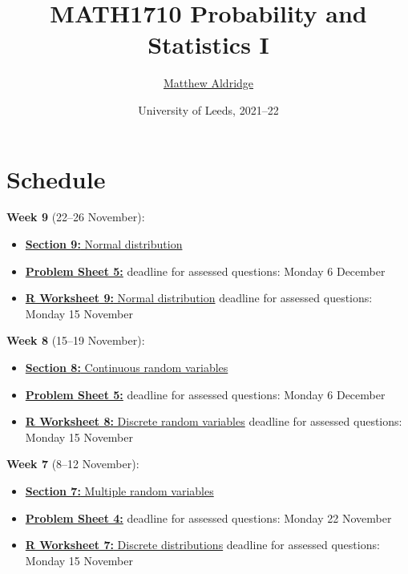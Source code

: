 \documentclass[
  a4paper,
]{book}
\title{MATH1710 Probability and Statistics I}
\author{\href{mailto:math1710@leeds.ac.uk}{Matthew Aldridge}}
\date{University of Leeds, 2021--22}
\providecommand{\tightlist}{%
  \setlength{\itemsep}{0pt}\setlength{\parskip}{0pt}}
\theoremstyle{definition}
\theoremstyle{definition}
\theoremstyle{definition}
\theoremstyle{definition}
\theoremstyle{remark}
\begin{document}
\maketitle

{
\setcounter{tocdepth}{1}
\tableofcontents
}
\hypertarget{schedule}{%
\chapter*{Schedule}\label{schedule}}

\textbf{Week 9} (22--26 November):

\begin{itemize}
\tightlist
\item
  \protect\hyperlink{S09-normal}{\textbf{Section 9:} Normal distribution}
\item
  \protect\hyperlink{P5}{\textbf{Problem Sheet 5:}} deadline for assessed questions: Monday 6 December
\item
  \protect\hyperlink{r-work}{\textbf{R Worksheet 9:} Normal distribution} deadline for assessed questions: Monday 15 November
\end{itemize}

\textbf{Week 8} (15--19 November):

\begin{itemize}
\tightlist
\item
  \protect\hyperlink{S07-continuous}{\textbf{Section 8:} Continuous random variables}
\item
  \protect\hyperlink{P5}{\textbf{Problem Sheet 5:}} deadline for assessed questions: Monday 6 December
\item
  \protect\hyperlink{r-work}{\textbf{R Worksheet 8:} Discrete random variables} deadline for assessed questions: Monday 15 November
\end{itemize}

\textbf{Week 7} (8--12 November):

\begin{itemize}
\tightlist
\item
  \protect\hyperlink{S07-multi-rv}{\textbf{Section 7:} Multiple random variables}
\item
  \protect\hyperlink{P4}{\textbf{Problem Sheet 4:}} deadline for assessed questions: Monday 22 November
\item
  \protect\hyperlink{r-work}{\textbf{R Worksheet 7:} Discrete distributions} deadline for assessed questions: Monday 15 November
\end{itemize}
\end{document}
